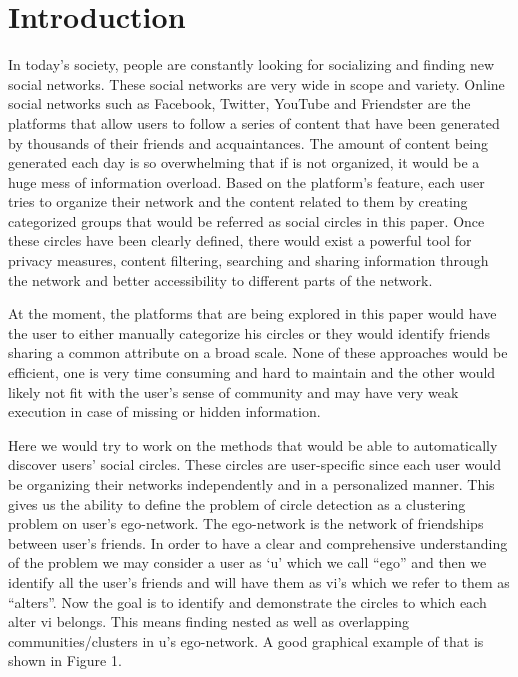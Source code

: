 \documentclass[12pt,a4paper]{article}
\begin{document}
\section*{Introduction}
\par In today's society, people are constantly looking for socializing and finding new social networks. These social networks are very wide in scope and variety. Online social networks such as Facebook, Twitter, YouTube and Friendster are the platforms that allow users to follow a series of content that have been generated by thousands of their friends and acquaintances. The amount of content being generated each day is so overwhelming that if is not organized, it would be a huge mess of information overload. Based on the platform's feature, each user tries to organize their network and the content related to them by creating categorized groups that would be referred as social circles in this paper. Once these circles have been clearly defined, there would exist a powerful tool for privacy measures, content filtering, searching and sharing information through the network and better accessibility to different parts of the network.\\


\par \noindent At the moment, the platforms that are being explored in this paper would have the user to either manually categorize his circles or they would identify friends sharing a common attribute on a broad scale. None of these approaches would be efficient, one is very time consuming and hard to maintain and the other would likely not fit with the user's sense of community and may have very weak execution in case of missing or hidden information. \\

\par \noindent Here we would try to work on the methods that would be able to automatically discover users' social circles. These circles are user-specific since each user would be organizing their networks independently and in a personalized manner. This gives us the ability to define the problem of circle detection as a clustering problem on user's ego-network. The ego-network is the network of friendships between user's friends. In order to have a clear and comprehensive understanding of the problem we may consider a user as `u' which we call ``ego'' and then we identify all the user's friends and will have them as vi's which we refer to them as ``alters''. Now the goal is to identify and demonstrate the circles to which each alter vi belongs. This means finding nested as well as overlapping communities/clusters in u's ego-network. A good graphical example of that is shown in Figure 1.\\
\end{document}

